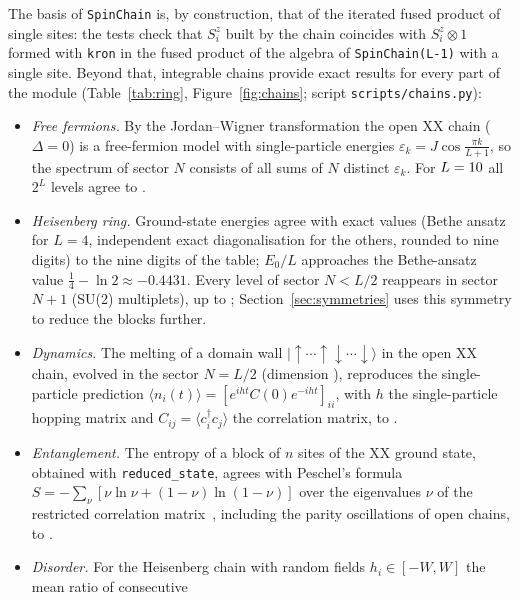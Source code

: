 \documentclass[11pt]{article}
\begin{document}
The basis of \texttt{SpinChain} is, by construction, that of the iterated fused product of single sites:
the tests check that $S^z_i$ built by the chain coincides with $S^z_i\otimes1$ formed with
\texttt{kron} in the fused product of the algebra of \texttt{SpinChain(L-1)} with a single site. Beyond that, integrable
chains provide exact results for every part of the module (Table~\ref{tab:ring}, Figure~\ref{fig:chains};
script \texttt{scripts/chains.py}):
\begin{itemize}
\item \emph{Free fermions.} By the Jordan--Wigner transformation the open XX chain ($\Delta=0$) is a free-fermion
model with single-particle energies $\varepsilon_k=J\cos\frac{\pi k}{L+1}$, so the spectrum of sector $N$ consists
of all sums of $N$ distinct $\varepsilon_k$. For $L=\IfFileExists{generated/chains.tex}{\ChainFFL}{10}$ all
$2^L$ levels agree to .
\item \emph{Heisenberg ring.} Ground-state energies agree with exact values (Bethe ansatz for $L=4$, independent exact diagonalisation
for the others, rounded to nine digits) to the nine digits of the table; $E_0/L$ approaches the Bethe-ansatz value $\tfrac14-\ln2\approx-0.4431$. Every level of sector
$N<L/2$ reappears in sector $N+1$ (SU(2) multiplets), up to
; Section~\ref{sec:symmetries} uses this symmetry to
reduce the blocks further.
\item \emph{Dynamics.} The melting of a domain wall $|\!\uparrow\cdots\uparrow\downarrow\cdots\downarrow\rangle$ in
the open XX chain, evolved in the sector $N=L/2$ (dimension ), reproduces the single-particle prediction
$\langle n_i(t)\rangle=[e^{iht}C(0)e^{-iht}]_{ii}$, with $h$ the single-particle hopping matrix and
$C_{ij}=\langle c_i^\dagger c_j\rangle$ the correlation matrix, to .
\item \emph{Entanglement.} The entropy of a block of $n$ sites of the XX ground state, obtained with
\texttt{reduced\_state}, agrees with Peschel's formula $S=-\sum_\nu[\nu\ln\nu+(1-\nu)\ln(1-\nu)]$ over the
eigenvalues $\nu$ of the restricted correlation matrix~\cite{peschel2003}, including the parity oscillations
of open chains, to .
\item \emph{Disorder.} For the Heisenberg chain with random fields $h_i\in[-W,W]$ the mean ratio of consecutive

\end{itemize}
\end{document}
